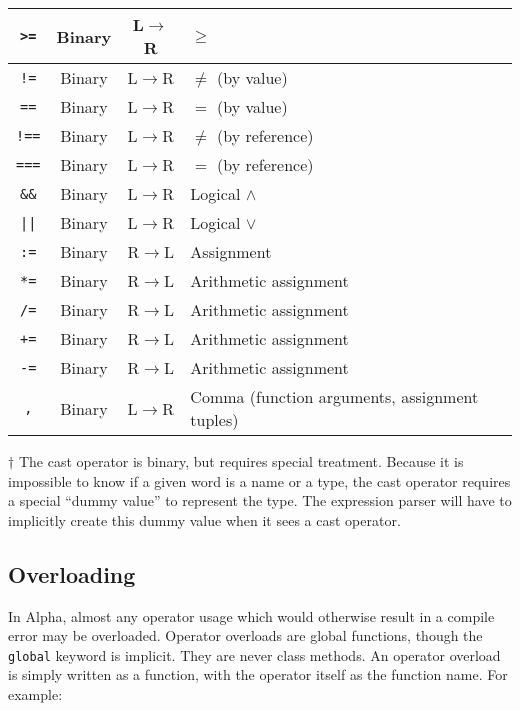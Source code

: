 \documentclass{article}
\begin{document}
\begin{center}
\begin{threeparttable}
\begin{tabular}{|c|c|c|l|}
      \texttt{>=} & Binary & L$\to$R & $\geq$ \\ \hline
      \texttt{!=} & Binary & L$\to$R & $\not=$ (by value) \\
      \texttt{==} & Binary & L$\to$R & $=$ (by value) \\
      \texttt{!==} & Binary & L$\to$R & $\not=$ (by reference) \\
      \texttt{===} & Binary & L$\to$R & $=$ (by reference) \\ \hline
      \texttt{\&\&} & Binary & L$\to$R & Logical $\land$ \\ \hline
      \texttt{||} & Binary & L$\to$R & Logical $\lor$ \\ \hline
      \texttt{:=} & Binary & R$\to$L & Assignment \\
      \texttt{*=} & Binary & R$\to$L & Arithmetic assignment \\
      \texttt{/=} & Binary & R$\to$L & Arithmetic assignment \\
      \texttt{+=} & Binary & R$\to$L & Arithmetic assignment \\
      \texttt{-=} & Binary & R$\to$L & Arithmetic assignment \\ \hline
      \texttt{,} & Binary & L$\to$R & Comma (function arguments, assignment tuples) \\ \hline
    \end{tabular}
    \begin{tablenotes}
      \item{$\dagger$ \small{The cast operator is binary, but requires special treatment.
          Because it is impossible to know if a given word is a name or a type, the
          cast operator requires a special ``dummy value'' to represent the type. The
          expression parser will have to implicitly create this dummy value when it sees
          a cast operator.}}
    \end{tablenotes}
  \end{threeparttable}
\end{center}

\subsection{Overloading}
\label{sub:operators:overloading}

In Alpha, almost any operator usage which would otherwise result in a compile
error
may be overloaded. Operator overloads are global functions, though the
\texttt{global} keyword is implicit. They are never class methods. An operator
overload is simply written as a function, with the operator itself as the
function name. For example:
\end{document}
